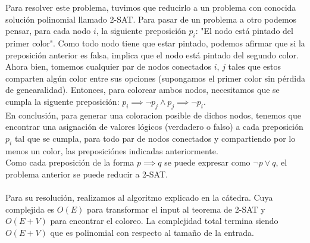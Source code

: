 Para resolver este problema, tuvimos que reducirlo a un problema con conocida solución polinomial llamado 2-SAT.
Para pasar de un problema a otro podemos pensar, para cada nodo $i$, la siguiente preposición $p_i$: "El nodo está pintado del primer color". Como todo nodo tiene que estar pintado, podemos afirmar que si la preposición anterior es falsa, implica que el nodo está pintado del segundo color. \\
Ahora bien, tomemos cualquier par de nodos conectados $i$, $j$ tales que estos comparten algún color entre sus opciones (supongamos el primer color sin pérdida de genearalidad). Entonces, para colorear ambos nodos, necesitamos que se cumpla la siguente preposición: $p_i \implies \neg p_j \wedge p_j \implies \neg p_i $. \\
En conclusión, para generar una coloracion posible de dichos nodos, tenemos que encontrar una asignación de valores lógicos (verdadero o falso) a cada preposición $p_i$ tal que se cumpla, para todo par de nodos conectados y compartiendo por lo menos un color, las preposiciónes indicadas anteriormente. \\
Como cada preposición de la forma $p \implies q$ se puede expresar como $\neg p \vee q$, el problema anterior se puede reducir a 2-SAT. \\\\

Para su resolución, realizamos al algoritmo explicado en la cátedra. Cuya complejida es $O(E)$ para transformar el input al teorema de 2-SAT y $O(E+V)$ para encontrar el coloreo. La complejidad total termina siendo $O(E+V)$ que es polinomial con respecto al tamaño de la entrada. \\